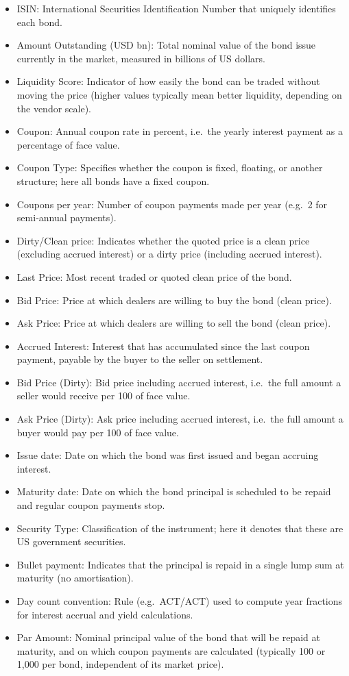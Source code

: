 \documentclass[
  letterpaper,
  DIV=11,
  numbers=noendperiod]{scrreprt}
\providecommand{\tightlist}{%
  \setlength{\itemsep}{0pt}\setlength{\parskip}{0pt}}
\begin{document}
\begin{itemize}
\tightlist
\item
  ISIN: International Securities Identification Number that uniquely
  identifies each bond.
\item
  Amount Outstanding (USD bn): Total nominal value of the bond issue
  currently in the market, measured in billions of US dollars.
\item
  Liquidity Score: Indicator of how easily the bond can be traded
  without moving the price (higher values typically mean better
  liquidity, depending on the vendor scale).
\item
  Coupon: Annual coupon rate in percent, i.e.~the yearly interest
  payment as a percentage of face value.
\item
  Coupon Type: Specifies whether the coupon is fixed, floating, or
  another structure; here all bonds have a fixed coupon.
\item
  Coupons per year: Number of coupon payments made per year (e.g.~2 for
  semi‑annual payments).
\item
  Dirty/Clean price: Indicates whether the quoted price is a clean price
  (excluding accrued interest) or a dirty price (including accrued
  interest).
\item
  Last Price: Most recent traded or quoted clean price of the bond.
\item
  Bid Price: Price at which dealers are willing to buy the bond (clean
  price).
\item
  Ask Price: Price at which dealers are willing to sell the bond (clean
  price).
\item
  Accrued Interest: Interest that has accumulated since the last coupon
  payment, payable by the buyer to the seller on settlement.
\item
  Bid Price (Dirty): Bid price including accrued interest, i.e.~the full
  amount a seller would receive per 100 of face value.
\item
  Ask Price (Dirty): Ask price including accrued interest, i.e.~the full
  amount a buyer would pay per 100 of face value.
\item
  Issue date: Date on which the bond was first issued and began accruing
  interest.
\item
  Maturity date: Date on which the bond principal is scheduled to be
  repaid and regular coupon payments stop.
\item
  Security Type: Classification of the instrument; here it denotes that
  these are US government securities.
\item
  Bullet payment: Indicates that the principal is repaid in a single
  lump sum at maturity (no amortisation).
\item
  Day count convention: Rule (e.g.~ACT/ACT) used to compute year
  fractions for interest accrual and yield calculations.
\item
  Par Amount: Nominal principal value of the bond that will be repaid at
  maturity, and on which coupon payments are calculated (typically 100
  or 1,000 per bond, independent of its market price).
\end{itemize}
\end{document}

